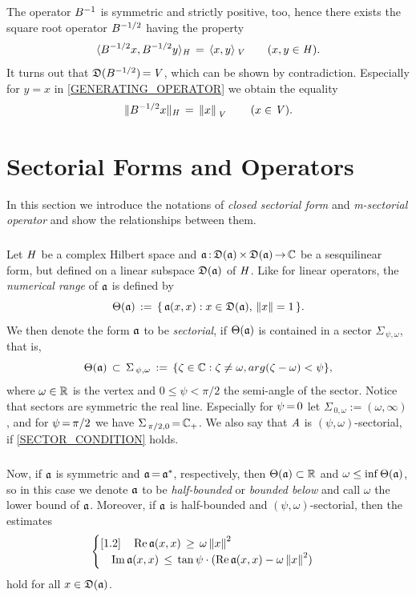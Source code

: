 \documentclass[11pt,twoside]{article}
\begin{document}
\subparagraph*{}
The operator ${B}^{-1}$ is symmetric and strictly positive,
too,
hence there exists the square root operator ${B}^{-1/2}$
having the property
\begin{equation}\label{GENERATING_OPERATOR}
\langle {B}^{-1/2} x,{B}^{-1/2} y \rangle_{\mathit{H}} \,=\, \langle x,y \rangle_{\,\mathit{V}}
\quad \quad (x,y \in \mathit{H}).
\end{equation}
It turns out that $\mathfrak{D}({B}^{-1/2}) {\,=\,} \mathit{V}$,
which can be shown by contradiction.
Especially for $y=x$ in \eqref{GENERATING_OPERATOR} we obtain the equality
\[
\lVert {B}^{-1/2}x \rVert_{\mathit{H}} \,=\, \left\lVert x \right\rVert_{\,\mathit{V}}
\quad \quad (x \in \mathit{V}).
\]

\section{Sectorial Forms and Operators}                                        %
In this section we introduce
the notations of \textit{closed sectorial form} and
\textit{m-sectorial operator}
and show the relationships between them.

\subparagraph*{} %
Let $\mathit{H}$ be a complex Hilbert space
and $\mathfrak{a}{\,:\,}\mathfrak{D}(\mathfrak{a}) {\,\times\,} \mathfrak{D}(\mathfrak{a}) {\,\to\,} {\mathbb{C}}$ be a sesquilinear form,
but defined on a linear subspace $\mathfrak{D}(\mathfrak{a})$ of $\mathit{H}$.
Like for linear operators,
the \textit{numerical range} of $\mathfrak{a}$ is defined by
\[
\Theta(\mathfrak{a}) \,:=\,
\{\, \mathfrak{a}(x,x): x \in \mathfrak{D}(\mathfrak{a}), \, \left\lVert x \right\rVert=1 \,\}.
\]
We then denote the form $\mathfrak{a}$ to be \textit{sectorial},
if $\Theta(\mathfrak{a})$ is contained in a sector $\Sigma_{\,\psi,\omega}$,
that is,
\begin{equation}\label{SECTOR_CONDITION}
\Theta(\mathfrak{a}) \, \subset \,
\Sigma_{\,\psi,\omega} \,:=\,
\{\zeta \in {\mathbb{C}}: \zeta \neq \omega, arg(\zeta-\omega) < \psi \},
\end{equation}
where $\omega \in {\mathbb{R}}$ is the vertex
and $0 \leq \psi < \pi/2$ the semi-angle of the sector.
Notice that sectors are symmetric {\wrt} the real line.
Especially for $\psi {\,=\,} 0$ let $\Sigma_{\,0,\omega} := (\omega,\infty)$,
and for $\psi {\,=\,} \pi/2$ we have $\Sigma_{\,\pi/2,0} {\,=\,} {\mathbb{C}}_+$.
We also say that $\mathit{A}$ is $(\psi,\omega)$-sectorial,
if \eqref{SECTOR_CONDITION} holds.

\subparagraph*{} %
Now,
if $\mathfrak{a}$ is symmetric and $\mathfrak{a} {\,=\,} \mathfrak{a}^*$,
respectively,
then $\Theta(\mathfrak{a}) \subset {\mathbb{R}}$ and $\omega \leq \inf \Theta(\mathfrak{a})$, 
so in this case we denote $\mathfrak{a}$ to be 
\textit{half-bounded} or \textit{bounded below}
and call $\omega$ the lower bound of $\mathfrak{a}$.
Moreover,
if $\mathfrak{a}$ is half-bounded and $(\psi,\omega)$-sectorial,
then the estimates
\[
\begin{cases}[1.2]
\quad \operatorname{Re} \mathfrak{a}(x,x) \, \geq \, \omega \left\lVert x \right\rVert^2 \\
\quad \operatorname{Im} \mathfrak{a}(x,x) \, \leq \,
      \tan \psi \cdot (\operatorname{Re} \mathfrak{a}(x,x) - \omega \left\lVert x \right\rVert^2)\\
\end{cases}
\]
hold for all $x \in \mathfrak{D}(\mathfrak{a})$.
\end{document}
